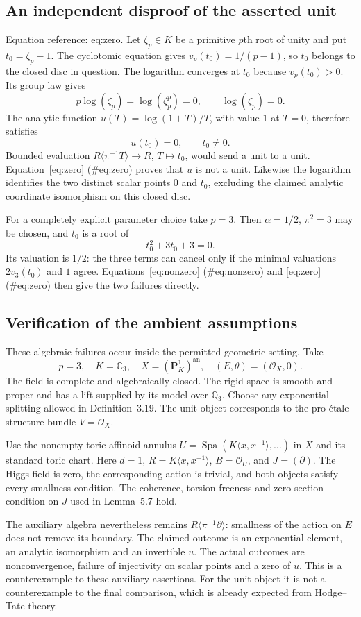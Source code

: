 \documentclass[10pt]{article}
\begin{document}
\subsection*{An independent disproof of the asserted unit}
Equation reference: eq:zero. Let \(\zeta_p\in K\) be a primitive \(p\)th root of unity and put \(t_0=\zeta_p-1\). The cyclotomic equation gives \(v_p(t_0)=1/(p-1)\), so \(t_0\) belongs to the closed disc in question. The logarithm converges at \(t_0\) because \(v_p(t_0)>0\). Its group law gives \[p\log(\zeta_p)=\log(\zeta_p^p)=0,\qquad
 \log(\zeta_p)=0.\] The analytic function \(u(T)=\log(1+T)/T\), with value \(1\) at \(T=0\), therefore satisfies \[
 u(t_0)=0,\qquad t_0\ne0.\] Bounded evaluation \(R\langle\pi^{-1}T\rangle\to R\), \(T\mapsto t_0\), would send a unit to a unit. Equation [eq:zero] (\#eq:zero) proves that \(u\) is not a unit. Likewise the logarithm identifies the two distinct scalar points \(0\) and \(t_0\), excluding the claimed analytic coordinate isomorphism on this closed disc.\par
For a completely explicit parameter choice take \(p=3\). Then \(\alpha=1/2\), \(\pi^2=3\) may be chosen, and \(t_0\) is a root of \[t_0^2+3t_0+3=0.\] Its valuation is \(1/2\): the three terms can cancel only if the minimal valuations \(2v_3(t_0)\) and \(1\) agree. Equations [eq:nonzero] (\#eq:nonzero) and [eq:zero] (\#eq:zero) then give the two failures directly.\par
\subsection*{Verification of the ambient assumptions}
These algebraic failures occur inside the permitted geometric setting. Take \[p=3,\quad K=\mathbb C_3,\quad X=(\mathbf P^1_K)^{\mathrm{an}},
 \quad (E,\theta)=(\mathcal O_X,0).\] The field is complete and algebraically closed. The rigid space is smooth and proper and has a lift supplied by its model over \(\mathbb Q_3\). Choose any exponential splitting allowed in Definition 3.19. The unit object corresponds to the pro-étale structure bundle \(V=\mathcal O_X\).\par
Use the nonempty toric affinoid annulus \(U=\operatorname{Spa}(K\langle x,x^{-1}\rangle,\ldots)\) in \(X\) and its standard toric chart. Here \(d=1\), \(R=K\langle x,x^{-1}\rangle\), \(B=\mathcal O_U\), and \(J=(\partial)\). The Higgs field is zero, the corresponding action is trivial, and both objects satisfy every smallness condition. The coherence, torsion-freeness and zero-section condition on \(J\) used in Lemma 5.7 hold.\par
The auxiliary algebra nevertheless remains \(R\langle\pi^{-1}\partial\rangle\): smallness of the action on \(E\) does not remove its boundary. The claimed outcome is an exponential element, an analytic isomorphism and an invertible \(u\). The actual outcomes are nonconvergence, failure of injectivity on scalar points and a zero of \(u\). This is a counterexample to these auxiliary assertions. For the unit object it is not a counterexample to the final comparison, which is already expected from Hodge–Tate theory.\par
\end{document}
